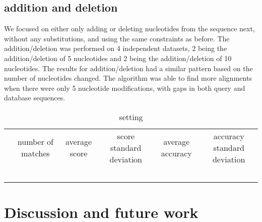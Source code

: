 \documentclass{article}
\begin{document}
\subsection*{addition and deletion}
We focused on either only adding or deleting nucleotides from the sequence next, without any substitutions, and using the same constraints as before. The addition/deletion was performed on 4 independent datasets, 2 being the addition/deletion of 5 nucleotides and 2 being the addition/deletion of 10 nucleotides. The results for addition/deletion had a similar pattern based on the number of nucleotides changed. The algorithm was able to find more alignments when there were only 5 nucleotide modifications, with gaps in both query and database sequences.

\begin{table}
    \centering
    \begin{tabular}{cccccc}
         & number of matches & average score & score standard deviation & average accuracy & accuracy standard deviation\\
         &  &  &  &  & \\
         &  &  &  &  & \\
         &  &  &  &  & \\
         &  &  &  &  & \\
         &  &  &  &  & \\
    \end{tabular}
    \caption{setting}
    \label{tab:my_label}
\end{table}


\section*{Discussion and future	work}
\end{document}
